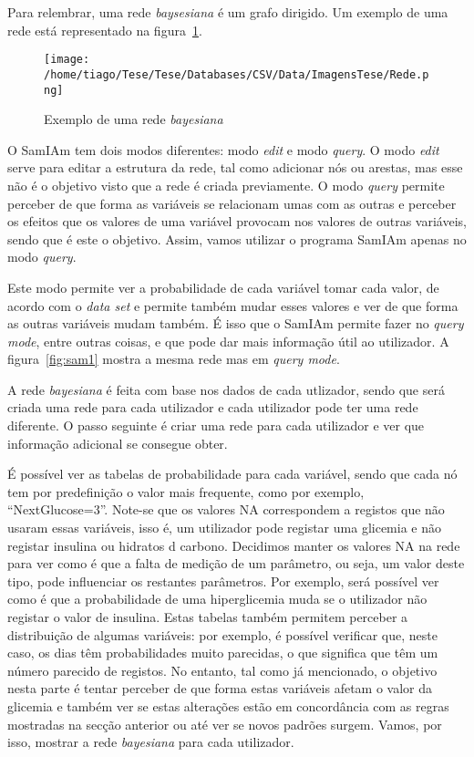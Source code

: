 Para relembrar, uma rede \textit{baysesiana} é um grafo dirigido. Um exemplo de uma rede está representado na figura~\ref{fig:rede}.
\begin{figure}[H]
\centering
\texttt{[image: /home/tiago/Tese/Tese/Databases/CSV/Data/ImagensTese/Rede.png]}
\caption{Exemplo de uma rede \textit{bayesiana}}
\label{fig:rede}
\end{figure}

O \ac{SamIAm} tem dois modos diferentes: modo \textit{edit} e modo \textit{query}. O modo \textit{edit} serve para editar a estrutura da rede, tal como adicionar nós ou arestas, mas esse não é o objetivo visto que a rede é criada previamente. O modo \textit{query} permite perceber de que forma as variáveis se relacionam umas com as outras e perceber os efeitos que os valores de uma variável provocam nos valores de outras variáveis, sendo que é este o objetivo. Assim, vamos utilizar o programa SamIAm apenas no modo \textit{query}.

Este modo permite ver a probabilidade de cada variável tomar cada valor, de acordo com o \textit{data set} e permite também mudar esses valores e ver de que forma as outras variáveis mudam também. É isso que o \ac{SamIAm} permite fazer no \textit{query mode}, entre outras coisas, e que pode dar mais informação útil ao utilizador. A figura~\ref{fig:sam1} mostra a mesma rede mas em \textit{query mode}.

A rede \textit{bayesiana} é feita com base nos dados de cada utlizador, sendo que será criada uma rede para cada utilizador e cada utilizador pode ter uma rede diferente. O passo seguinte é criar uma rede para cada utilizador e ver que informação adicional se consegue obter.

É possível ver as tabelas de probabilidade para cada variável, sendo que cada nó tem por predefinição o valor mais frequente, como por exemplo, ``Next\textunderscore Glucose=3''. Note-se que os valores \ac{NA} correspondem a registos que não usaram essas variáveis, isso é, um utilizador pode registar uma glicemia e não registar insulina ou hidratos d carbono. Decidimos manter os valores \ac{NA} na rede para ver como é que a falta de medição de um parâmetro, ou seja, um valor deste tipo, pode influenciar os restantes parâmetros. Por exemplo, será possível ver como é que a probabilidade de uma hiperglicemia muda se o utilizador não registar o valor de insulina. Estas tabelas também permitem perceber a distribuição de algumas variáveis: por exemplo, é possível verificar que, neste caso, os dias têm probabilidades muito parecidas, o que significa que têm um número parecido de registos. No entanto, tal como já mencionado, o objetivo nesta parte é tentar perceber de que forma estas variáveis afetam o valor da glicemia e também ver se estas alterações estão em concordância com as regras mostradas na secção anterior ou até ver se novos padrões surgem. Vamos, por isso, mostrar a rede \textit{bayesiana} para cada utilizador. 


